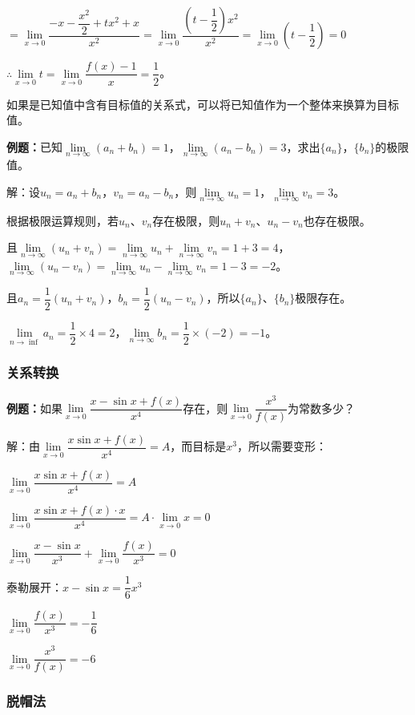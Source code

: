 \documentclass[UTF8, 12pt]{ctexart}
\begin{document}
$=\lim\limits_{x\to 0}\dfrac{-x-\dfrac{x^2}{2}+tx^2+x}{x^2}=\lim\limits_{x\to 0}\dfrac{\left(t-\dfrac{1}{2}\right)x^2}{x^2}=\lim\limits_{x\to 0}\left(t-\dfrac{1}{2}\right)=0$

$\therefore\lim\limits_{x\to 0}t=\lim\limits_{x\to 0}\dfrac{f(x)-1}{x}=\dfrac{1}{2}$。

如果是已知值中含有目标值的关系式，可以将已知值作为一个整体来换算为目标值。

\textbf{例题：}已知$\lim\limits_{n\to\infty}(a_n+b_n)=1$，$\lim\limits_{n\to\infty}(a_n-b_n)=3$，求出$\{a_n\}$，$\{b_n\}$的极限值。

解：设$u_n=a_n+b_n$，$v_n=a_n-b_n$，则$\lim\limits_{n\to\infty}u_n=1$，$\lim\limits_{n\to\infty}v_n=3$。

根据极限运算规则，若$u_n$、$v_n$存在极限，则$u_n+v_n$、$u_n-v_n$也存在极限。

且$\lim\limits_{n\to\infty}(u_n+v_n)=\lim\limits_{n\to\infty}u_n+\lim\limits_{n\to\infty}v_n=1+3=4$，$\lim\limits_{n\to\infty}(u_n-v_n)=\lim\limits_{n\to\infty}u_n-\lim\limits_{n\to\infty}v_n=1-3=-2$。

且$a_n=\dfrac{1}{2}(u_n+v_n)$，$b_n=\dfrac{1}{2}(u_n-v_n)$，所以$\{a_n\}$、$\{b_n\}$极限存在。

$\lim\limits_{n\to\inf}a_n=\dfrac{1}{2}\times4=2$，$\lim\limits_{n\to\infty}b_n=\dfrac{1}{2}\times(-2)=-1$。

\subsubsection{关系转换}

\textbf{例题：}如果$\lim\limits_{x\to 0}\dfrac{x-\sin x+f(x)}{x^4}$存在，则$\lim\limits_{x\to 0}\dfrac{x^3}{f(x)}$为常数多少？

解：由$\lim\limits_{x\to 0}\dfrac{x\sin x+f(x)}{x^4}=A$，而目标是$x^3$，所以需要变形：

$\lim\limits_{x\to 0}\dfrac{x\sin x+f(x)}{x^4}=A$

$\lim\limits_{x\to 0}\dfrac{x\sin x+f(x)\cdot x}{x^4}=A\cdot\lim\limits_{x\to 0}x=0$

$\lim\limits_{x\to 0}\dfrac{x-\sin x}{x^3}+\lim\limits_{x\to 0}\dfrac{f(x)}{x^3}=0$

$\text{泰勒展开：}x-\sin x=\dfrac{1}{6}x^3$

$\lim\limits_{x\to 0}\dfrac{f(x)}{x^3}=-\dfrac{1}{6}$

$\lim\limits_{x\to 0}\dfrac{x^3}{f(x)}=-6$

\subsubsection{脱帽法}
\end{document}
